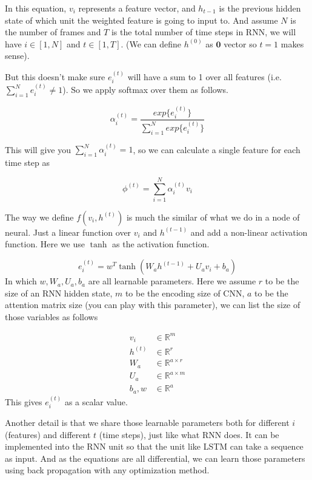 In this equation, $v_i$ represents a feature vector, and $h_{t-1}$ is the previous hidden state of which unit the weighted feature is going to input to. And assume $N$ is the number of frames and $T$ is the total number of time steps in RNN, we will have $i\in [1,N]$ and $t\in [1,T]$. (We can define $h^{(0)}$ as $\mathbf{0}$ vector so $t=1$ makes sense).

But this doesn't make sure $e_{i}^{(t)}$ will have a sum to 1 over all features (i.e. $\sum_{i=1}^Ne_i^{(t)}\neq 1$). So we apply softmax over them as follows.

\begin{equation}
\alpha_{i}^{(t)} = \frac{exp\{e_{i}^{(t)}\}}{\sum_{i=1}^Nexp\{e_{i}^{(t)}\}}
\end{equation}

This will give you $\sum_{i=1}^N\alpha_{i}^{(t)}=1$, so we can calculate a single feature for each time step as

\begin{equation}
\phi^{(t)}=\sum_{i=1}^N\alpha_{i}^{(t)}v_i
\end{equation}

The way we define $f(v_i,h^{(t)})$ is much the similar of what we do in a node of neural. Just a linear function over $v_i$ and $h^{(t-1)}$ and add a non-linear activation function. Here we use $\tanh$ as the activation function.

\begin{equation}
e_{i}^{(t)} = w^T\tanh(W_ah^{(t-1)}+U_av_i+b_a)
\end{equation}
In which $w,W_a,U_a,b_a$ are all learnable parameters. Here we assume $r$ to be the size of an RNN hidden state, $m$ to be the encoding size of CNN, $a$ to be the attention matrix size (you can play with this parameter), we can list the size of those variables as follows

\begin{align*}
v_i&\in \mathbb{R}^{m} \\
h^{(t)}&\in \mathbb{R}^{r}\\
W_a&\in \mathbb{R}^{a\times r}\\
U_a&\in \mathbb{R}^{a\times m}\\
b_a, w &\in \mathbb{R}^{a}
\end{align*}
This gives $e_i^{(t)}$ as a scalar value.

Another detail is that we share those learnable parameters both for different $i$ (features) and different $t$ (time steps), just like what RNN does. It can be implemented into the RNN unit so that the unit like LSTM can take a sequence as input. And as the equations are all differential, we can learn those parameters using back propagation with any optimization method.

